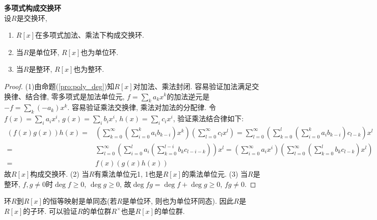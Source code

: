 \begin{pro} \textbf{多项式构成交换环}\\
设$R$是交换环,
\begin{enumerate}
\item $R[x]$在多项式加法、乘法下构成交换环. 
\item 当$R$是单位环, $R[x]$也为单位环.
\item 当$R$是整环, $R[x]$也为整环.
\end{enumerate}
\end{pro}

\begin{proof}
(1)由命题(\ref{pro:poly_deg})知$R[x]$对加法、乘法封闭. 容易验证加法满足交换律、结合律, 零多项式是加法单位元, $f=\sum_k a_k x^k$的加法逆元是$-f=\sum_k (-a_k) x^k$. 容易验证乘法交换律, 乘法对加法的分配律. 令$f(x)=\sum_i a_i x^i$, $g(x)=\sum_i b_i x^i$, $h(x)=\sum_i c_i x^i$, 验证乘法结合律如下:
\begin{align*}
    (f(x)g(x))h(x)=&\left(\sum_{k=0}^\infty \left(\sum_{i=0}^k a_ib_{k-i}\right) x^k \right) \left (\sum_{l=0}^\infty c_l x^l \right)
    = \sum_{l=0}^\infty \left(\sum_{k=0}^l \left(\sum_{i=0}^k a_ib_{k-i}\right) c_{l-k} \right) x^l \\
    =& \sum_{l=0}^\infty \left(\sum_{i=0}^l a_i \left(\sum_{k=0}^{l-i} b_{k} c_{l-i-k}\right) \right) x^l
    =\left (\sum_{i=0}^\infty a_i x^i \right) \left(\sum_{l=0}^\infty \left(\sum_{k=0}^l b_kc_{l-k}\right) x^l \right) \\
    =&f(x)(g(x)h(x))
\end{align*}
故$R[x]$构成交换环. (2) 当$R$有乘法单位元1, 1也是$R[x]$的乘法单位元. (3) 当$R$是整环, $f,g\neq 0$时$\deg f \ge 0$, $\deg g \ge 0$, 故$\deg fg = \deg f + \deg g \ge 0$, $fg\neq 0$. 
\end{proof}
环$R$到$R[x]$的恒等映射是单同态(若$R$是单位环, 则也为单位环同态). 因此$R$是$R[x]$的子环. 可以验证$R$的单位群$R^\times$也是$R[x]$的单位群.

